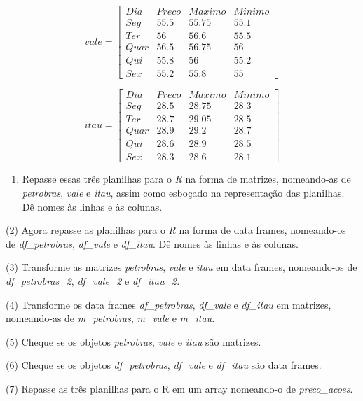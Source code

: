\documentclass[
  letterpaper,
  DIV=11,
  numbers=noendperiod]{scrreprt}
\providecommand{\tightlist}{%
  \setlength{\itemsep}{0pt}\setlength{\parskip}{0pt}}\usepackage{longtable,booktabs,array}
\begin{document}
\[
vale = \left[
\begin{array}{c|ccc}
Dia & Preco & Maximo & Minimo \\ \hline
Seg & 55.5 & 55.75 & 55.1\\
Ter & 56 & 56.6 & 55.5\\
Quar & 56.5 & 56.75 & 56\\
Qui & 55.8 & 56 & 55.2\\
Sex & 55.2 & 55.8 & 55
\end{array}
\right]
\]

\[
itau = \left[
\begin{array}{c|ccc}
Dia & Preco & Maximo & Minimo \\ \hline
Seg & 28.5 & 28.75 & 28.3\\
Ter & 28.7 & 29.05 & 28.5\\
Quar & 28.9 & 29.2 & 28.7\\
Qui & 28.6 & 28.9 & 28.5\\
Sex & 28.3 & 28.6 & 28.1
\end{array}
\right]
\]

\begin{enumerate}
\def\labelenumi{(\arabic{enumi})}
\tightlist
\item
  Repasse essas três planilhas para o \emph{R} na forma de matrizes,
  nomeando-as de \emph{petrobras}, \emph{vale} e \emph{itau}, assim como
  esboçado na representação das planilhas. Dê nomes às linhas e às
  colunas.
\end{enumerate}

(2) Agora repasse as planilhas para o \emph{R} na forma de data frames,
nomeando-os de \emph{df\_petrobras}, \emph{df\_vale} e \emph{df\_itau}.
Dê nomes às linhas e às colunas.

(3) Transforme as matrizes \emph{petrobras}, \emph{vale} e \emph{itau}
em data frames, nomeando-os de \emph{df\_petrobras\_2},
\emph{df\_vale\_2} e \emph{df\_itau\_2.}

(4) Transforme os data frames \emph{df\_petrobras}, \emph{df\_vale} e
\emph{df\_itau} em matrizes, nomeando-as de \emph{m\_petrobras},
\emph{m\_vale} e \emph{m\_itau.}

(5) Cheque se os objetos \emph{petrobras}, \emph{vale} e \emph{itau} são
matrizes.

(6) Cheque se os objetos \emph{df\_petrobras}, \emph{df\_vale} e
\emph{df\_itau} são data frames.

(7) Repasse as três planilhas para o R em um array nomeando-o de
\emph{preco\_acoes}.
\end{document}
